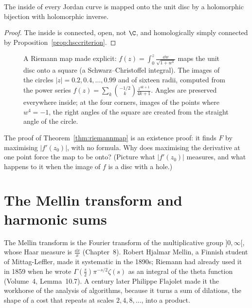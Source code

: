 \begin{corollary}\label{cor:jordanconformal}
The inside of every Jordan curve is mapped onto the unit disc by a holomorphic bijection with holomorphic inverse.
\end{corollary}
\begin{proof}
The inside is connected, open, not $\C$, and homologically simply connected by Proposition~\ref{prop:hsccriterion}.
\end{proof}

\begin{figure}[ht]
\centering
{}
\caption{A Riemann map made explicit: $f(z)=\int_0^z\frac{\dd w}{\sqrt{1+w^4}}$ maps the unit disc onto a square (a Schwarz--Christoffel integral). The images of the circles $|z|=0.2,0.4,\dots,0.99$ and of
sixteen radii, computed from the power series $f(z)=\sum_k\binom{-1/2}k\frac{z^{4k+1}}{4k+1}$. Angles are preserved everywhere inside; at the four corners, images of the points where $w^4=-1$, the right
angles of the square are created from the straight angle of the circle.}
\label{fig:squaremap}
\end{figure}

\begin{think}
The proof of Theorem~\ref{thm:riemannmap} is an existence proof: it finds $F$ by maximising $|f'(z_0)|$, with no formula. Why does maximising the derivative at one point force the map to be onto?
(Picture what $|f'(z_0)|$ measures, and what happens to it when the image of $f$ is a disc with a hole.)
\end{think}

\section{The Mellin transform and harmonic sums}\label{sec:mellin}

The Mellin transform is the Fourier transform of the multiplicative group $]0,\infty[$, whose Haar measure is $\frac{\dd x}x$ (Chapter~8). Robert Hjalmar Mellin, a Finnish student of Mittag-Leffler,
made it systematic in the 1890s; Riemann had already used it in 1859 when he wrote $\Gamma(\frac s2)\pi^{-s/2}\zeta(s)$ as an integral of the theta function (Volume~4, Lemma~10.7). A century later Philippe
Flajolet made it the workhorse of the analysis of algorithms, because it turns a sum of dilations, the shape of a cost that repeats at scales $2,4,8,\dots$, into a product.

